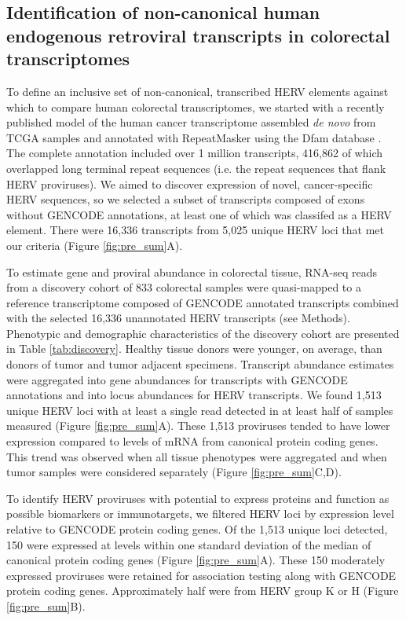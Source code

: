 \subsection*{Identification of non-canonical human endogenous retroviral transcripts in colorectal transcriptomes}
To define an inclusive set of non-canonical, transcribed HERV elements against which to compare human colorectal transcriptomes, we started with a recently published model of the human cancer transcriptome assembled \emph{de novo} from TCGA samples and annotated with RepeatMasker using the Dfam database \citep{Attig2019}.
The complete annotation included over 1 million transcripts, 416,862 of which overlapped long terminal repeat sequences (i.e. the repeat sequences that flank HERV proviruses).
We aimed to discover expression of novel, cancer-specific HERV sequences, so we selected a subset of transcripts composed of exons without GENCODE annotations, at least one of which was classifed as a HERV element.
There were 16,336 transcripts from 5,025 unique HERV loci that met our criteria (Figure \ref{fig:pre_sum}A).

To estimate gene and proviral abundance in colorectal tissue, RNA-seq reads from a discovery cohort of 833 colorectal samples were quasi-mapped to a reference transcriptome composed of GENCODE annotated transcripts combined with the selected 16,336 unannotated HERV transcripts (see Methods).
Phenotypic and demographic characteristics of the discovery cohort are presented in Table \ref{tab:discovery}.
Healthy tissue donors were younger, on average, than donors of tumor and tumor adjacent specimens.
Transcript abundance estimates were aggregated into gene abundances for transcripts with GENCODE annotations and into locus abundances for HERV transcripts.
We found 1,513 unique HERV loci with at least a single read detected in at least half of samples measured (Figure \ref{fig:pre_sum}A).
These 1,513 proviruses tended to have lower expression compared to levels of mRNA from canonical protein coding genes.
This trend was observed when all tissue phenotypes were aggregated and when tumor samples were considered separately (Figure \ref{fig:pre_sum}C,D).

To identify HERV proviruses with potential to express proteins and function as possible biomarkers or immunotargets, we filtered HERV loci by expression level relative to GENCODE protein coding genes.
Of the 1,513 unique loci detected, 150 were expressed at levels within one standard deviation of the median of canonical protein coding genes (Figure \ref{fig:pre_sum}A).
These 150 moderately expressed proviruses were retained for association testing along with GENCODE protein coding genes.
Approximately half were from HERV group K or H (Figure \ref{fig:pre_sum}B).

